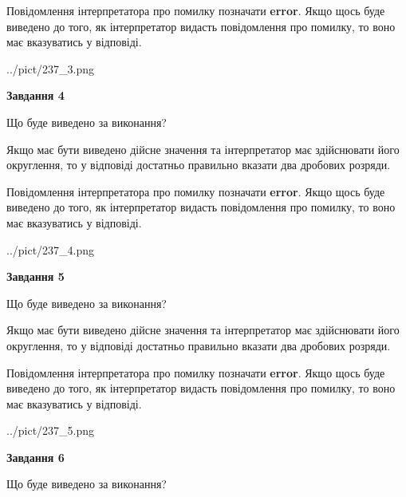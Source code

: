 \documentclass[12pt, ukrainian]{article}
\begin{document}
{\begin {Large}
Повідомлення інтерпретатора про помилку позначати \textbf{error}.
Якщо щось буде виведено до того, як інтерпретатор видасть повідомлення про помилку, 
то воно має вказуватись у відповіді. \par

\begin{center}
	{../pict/237_3.png}
\end{center}
\newpage

{\begin {center}\textbf{Завдання 4}\end {center}}\par
Що буде виведено за виконання? \par

Якщо має бути виведено дійсне значення та інтерпретатор має здійснювати його округлення, 
то у відповіді достатньо правильно вказати два дробових розряди.

Повідомлення інтерпретатора про помилку позначати \textbf{error}.
Якщо щось буде виведено до того, як інтерпретатор видасть повідомлення про помилку, 
то воно має вказуватись у відповіді. \par

\begin{center}
	{../pict/237_4.png}
\end{center}
\newpage

{\begin {center}\textbf{Завдання 5}\end {center}}\par
Що буде виведено за виконання? \par

Якщо має бути виведено дійсне значення та інтерпретатор має здійснювати його округлення, 
то у відповіді достатньо правильно вказати два дробових розряди.

Повідомлення інтерпретатора про помилку позначати \textbf{error}.
Якщо щось буде виведено до того, як інтерпретатор видасть повідомлення про помилку, 
то воно має вказуватись у відповіді. \par

\begin{center}
	{../pict/237_5.png}
\end{center}
\newpage

{\begin {center}\textbf{Завдання 6}\end {center}}\par
Що буде виведено за виконання? \par


\end{Large}}
\end{document}
